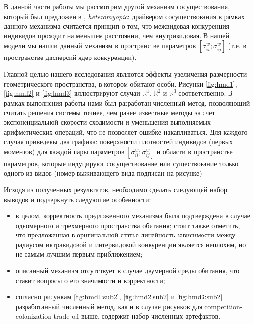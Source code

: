 В данной части работы мы рассмотрим другой механизм сосуществования, который был предложен в \cite{MURRELL}, \textit{heteromyopia}: драйвером сосуществования в рамках данного механизма считается принцип о том, что межвидовая конкуренция индивидов проходит на меньшем расстоянии, чем внутривидовая. В нашей модели мы нашли данный механизм в пространстве параметров $ \left[\sigma_{ii}^{w};\sigma_{ij}^{w}\right] $ (т.е. в пространстве дисперсий ядер конкуренции).

Главной целью нашего исследования являются эффекты увеличения размерности геометрического пространства, в котором обитают особи. Рисунки \ref{fig:hmd1}, \ref{fig:hmd2} и \ref{fig:hmd3} иллюстрируют случаи $ \mathbb{R}^{1} $, $ \mathbb{R}^{2} $ и $ \mathbb{R}^{3} $ соответственно. В рамках выполнения работы нами был разработан численный метод, позволяющий считать решения системы точнее, чем ранее известные методы за счет экспоненциальной скорости сходимости и уменьшения выполняемых арифметических операций, что не позволяет ошибке накапливаться. Для каждого случая приведены два графика: поверхности плотностей индивидов (первых моментов) для каждой пары параметров $ \left[\sigma_{ii}^{w};\sigma_{ij}^{w}\right] $ и области в пространстве параметров, которые индуцируют сосуществование или существование только одного из видов (номер выживающего вида подписан на рисунке).

Исходя из полученных результатов, необходимо сделать следующий набор выводов и подчеркнуть следующие особенности:

\begin{itemize}
	\item в целом, корректность предложенного механизма была подтверждена в случае одномерного и трехмерного пространства обитания; стоит также отметить, что предложенная в оригинальной статье линейность зависимости между радиусом интравидовой и интервидовой конкуренции является неплохим, но не самым лучшим первым приближением; 
	
	\item описанный механизм отсутствует в случае двумерной среды обитания, что ставит вопросы о его значимости и корректности; 
	
	\item согласно рисункам \ref{fig:hmd1:sub2}, \ref{fig:hmd2:sub2} и \ref{fig:hmd3:sub2} разработанный численный метод, как и в случае рисунков для competition-colonization trade-off выше, содержит набор численных артефактов.
\end{itemize}

